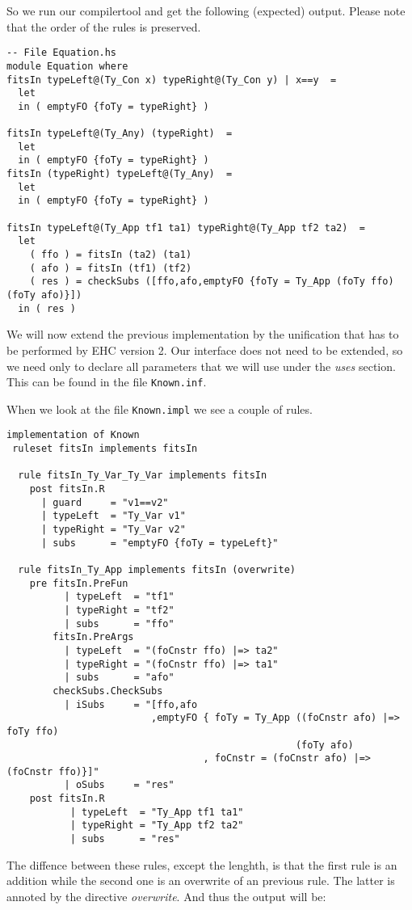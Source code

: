 \documentclass[10pt]{article}
\begin{document}
So we run our compilertool and get the following (expected) output. Please note that the order of the rules is preserved.
\begin{verbatim}
-- File Equation.hs
module Equation where
fitsIn typeLeft@(Ty_Con x) typeRight@(Ty_Con y) | x==y  =
  let
  in ( emptyFO {foTy = typeRight} )

fitsIn typeLeft@(Ty_Any) (typeRight)  =
  let
  in ( emptyFO {foTy = typeRight} )
fitsIn (typeRight) typeLeft@(Ty_Any)  =
  let
  in ( emptyFO {foTy = typeRight} )

fitsIn typeLeft@(Ty_App tf1 ta1) typeRight@(Ty_App tf2 ta2)  =
  let
    ( ffo ) = fitsIn (ta2) (ta1) 
    ( afo ) = fitsIn (tf1) (tf2) 
    ( res ) = checkSubs ([ffo,afo,emptyFO {foTy = Ty_App (foTy ffo) (foTy afo)}]) 
  in ( res )
\end{verbatim}

We will now extend the previous implementation by the unification that has to be performed by EHC version 2. Our interface does not need to be extended, so we need only to declare all parameters that we will use under the \emph{uses} section. This can be found in the file \texttt{Known.inf}.

When we look at the file \texttt{Known.impl} we see a couple of rules.
\begin{verbatim}
implementation of Known
 ruleset fitsIn implements fitsIn

  rule fitsIn_Ty_Var_Ty_Var implements fitsIn
    post fitsIn.R
      | guard     = "v1==v2"
      | typeLeft  = "Ty_Var v1"
      | typeRight = "Ty_Var v2"
      | subs      = "emptyFO {foTy = typeLeft}"

  rule fitsIn_Ty_App implements fitsIn (overwrite)
    pre fitsIn.PreFun
          | typeLeft  = "tf1"
          | typeRight = "tf2"
          | subs      = "ffo" 
        fitsIn.PreArgs
          | typeLeft  = "(foCnstr ffo) |=> ta2"
          | typeRight = "(foCnstr ffo) |=> ta1"
          | subs      = "afo"
        checkSubs.CheckSubs
          | iSubs     = "[ffo,afo
                         ,emptyFO { foTy = Ty_App ((foCnstr afo) |=> foTy ffo) 
                                                  (foTy afo)
                                  , foCnstr = (foCnstr afo) |=> (foCnstr ffo)}]"
          | oSubs     = "res"
    post fitsIn.R
           | typeLeft  = "Ty_App tf1 ta1"
           | typeRight = "Ty_App tf2 ta2"
           | subs      = "res"    
\end{verbatim}
The diffence between these rules, except the lenghth, is that the first rule is an addition while the second one is an overwrite of an previous rule. The latter is annoted by the directive \emph{overwrite}. And thus the output will be:
\end{document}
